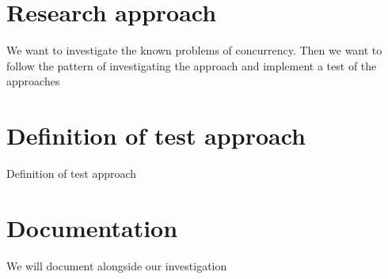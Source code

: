 \makeatletter {}\makeatother
{}
\section{Research approach}
We want to investigate the known problems of concurrency. Then we want to follow the pattern of investigating the approach and implement a test of the approaches

\section{Definition of test approach}
Definition of test approach

\section{Documentation}
We will document alongside our investigation


\worksheetend
